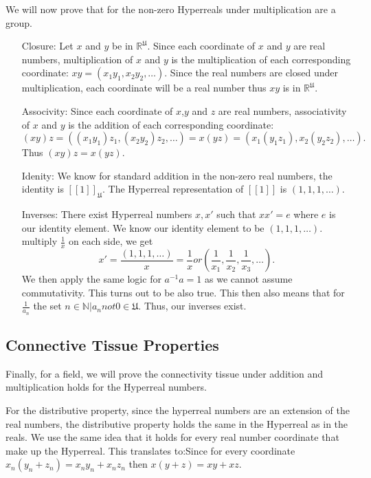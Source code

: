 \documentclass[12pt]{report}
\newcommand{\R}{\mathbb{R}}
\newcommand{\N}{\mathbb{N}}
\newcommand{\U}{\mathfrak{U}}
\begin{document}
We will now prove that for the non-zero Hyperreals under multiplication are a group.
\begin{enumerate}
    \item[Closure:]Let $x$ and $y$ be in $\R^{\U}$.
    Since each coordinate of $x$ and $y$ are real numbers, multiplication of $x$ and $y$ is the multiplication of each corresponding coordinate: $xy = (x_1 y_1, x_2 y_2,\ldots)$.
    Since the real numbers are closed under multiplication, each coordinate will be a real number thus $xy$ is in $\R^\U$.
    \item[Associvity:] Since each coordinate of $x$,$y$ and $z$ are real numbers, associativity of $x$ and $y $ is the addition of each corresponding coordinate: \[(xy)z = ((x_1 y_1)z_1, (x_2 y_2)z_2,\ldots) =x(yz) = (x_1  (y_1 z_1), x_2(y_2 z_2),\ldots).\]Thus $(xy)z= x(yz)$.
    \item[Idenity:]We know for standard addition in the non-zero real numbers, the identity is $[[1]]_{\U}$.
    The Hyperreal representation of $[[1]]$ is $(1, 1, 1,\ldots)$.
    \item[Inverses:]There exist Hyperreal numbers $x, x'$ such that $xx' = e $ where $e$ is our identity element.
    We know our identity element to be $(1, 1, 1, \ldots)$.
    multiply $\frac{1}{x}$ on each side, we get \[x' = \frac{(1, 1, 1,\ldots)}{x} = \frac{1}{x} or (\frac{1}{x_1}, \frac{1}{x_2}, \frac{1}{x_3},\ldots).\] We then apply the same logic for $a^{-1} a =1$ as we cannot assume commutativity.
    This turns out to be also true.
    This then also means that for $\frac{1}{a_n}$ the set ${n \in \N| a_n not 0 } \in \U$.
    Thus, our inverses exist.
\end{enumerate}
\subsection*{Connective Tissue Properties}
Finally, for a field, we will prove the connectivity tissue under addition and multiplication holds for the Hyperreal numbers.
\newline \par
For the distributive property, since the hyperreal numbers are an extension of the real numbers, the distributive property holds the same in the Hyperreal as in the reals.
We use the same idea that it holds for every real number coordinate that make up the Hyperreal.
This translates to:\newline Since for every coordinate $x_n(y_n+z_n) = x_n y_n + x_n z_n$ then $x(y+z)= xy+xz$.\newline
\end{document}

